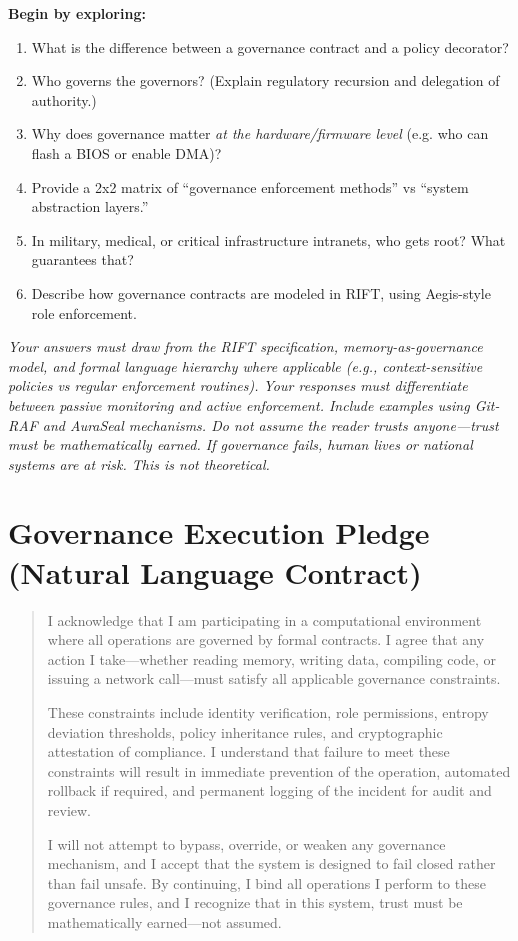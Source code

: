 \textbf{Begin by exploring:}
\begin{enumerate}
\item What is the difference between a governance contract and a policy decorator?
\item Who governs the governors? (Explain regulatory recursion and delegation of authority.)
\item Why does governance matter \textit{at the hardware/firmware level} (e.g. who can flash a BIOS or enable DMA)?
\item Provide a 2x2 matrix of ``governance enforcement methods'' vs ``system abstraction layers.''
\item In military, medical, or critical infrastructure intranets, who gets root? What guarantees that?
\item Describe how governance contracts are modeled in RIFT, using Aegis-style role enforcement.
\end{enumerate}

\textit{Your answers must draw from the RIFT specification, memory-as-governance model, and formal language hierarchy where applicable (e.g., context-sensitive policies vs regular enforcement routines). Your responses must differentiate between passive monitoring and active enforcement. Include examples using Git-RAF and AuraSeal mechanisms. Do not assume the reader trusts anyone—trust must be mathematically earned. If governance fails, human lives or national systems are at risk. This is not theoretical.}


\section*{Governance Execution Pledge (Natural Language Contract)}
{}

\begin{quote}
I acknowledge that I am participating in a computational environment where all operations are governed by formal contracts. I agree that any action I take—whether reading memory, writing data, compiling code, or issuing a network call—must satisfy all applicable governance constraints. 

These constraints include identity verification, role permissions, entropy deviation thresholds, policy inheritance rules, and cryptographic attestation of compliance. I understand that failure to meet these constraints will result in immediate prevention of the operation, automated rollback if required, and permanent logging of the incident for audit and review. 

I will not attempt to bypass, override, or weaken any governance mechanism, and I accept that the system is designed to fail closed rather than fail unsafe. By continuing, I bind all operations I perform to these governance rules, and I recognize that in this system, trust must be mathematically earned—not assumed.
\end{quote}

